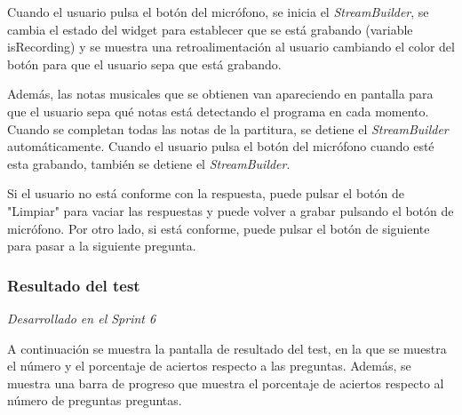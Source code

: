Cuando el usuario pulsa el botón del micrófono, se inicia el \textit{StreamBuilder}, se cambia el estado del widget para establecer que se está grabando (variable isRecording) y se muestra una retroalimentación
al usuario cambiando el color del botón para que el usuario sepa que está grabando.

Además, las notas musicales que se obtienen van apareciendo en pantalla para que el usuario sepa qué notas está detectando el programa en cada momento.
Cuando se completan todas las notas de la partitura, se detiene el \textit{StreamBuilder} automáticamente.
Cuando el usuario pulsa el botón del micrófono cuando esté esta grabando, también se detiene el \textit{StreamBuilder}.

Si el usuario no está conforme con la respuesta, puede pulsar el botón de "Limpiar" para vaciar las respuestas y puede volver a grabar pulsando el botón de micrófono. Por otro lado, si está conforme, puede pulsar el botón de siguiente para pasar a la siguiente pregunta.

\subsubsection{Resultado del test}
\label{sec:pregunta}
\textit{Desarrollado en el Sprint 6}

A continuación se muestra la pantalla de resultado del test, en la que se muestra el número y el porcentaje de aciertos respecto a las preguntas. Además, se muestra una barra de progreso que muestra el porcentaje de aciertos respecto al número de preguntas preguntas.

